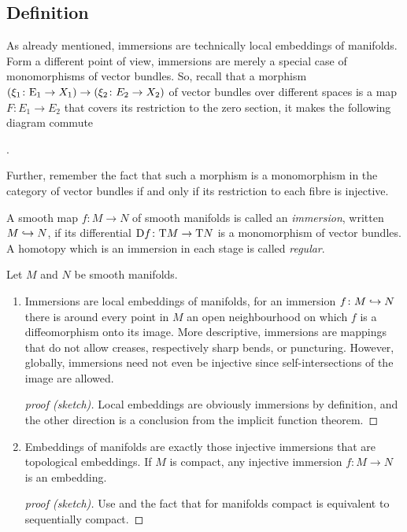 \subsection{Definition}
As already mentioned, immersions are technically local embeddings of
manifolds.
Form a different point of view, immersions are merely a special case
of monomorphisms of vector bundles. So, recall that a morphism
$(\xi_1\colon\mathrm{E}_1\to X_1)\to(\xi_2\colon E_2\to X_2)$ 
of vector bundles over different spaces is a map $F\colon E_1\to E_2$
that covers its restriction to the zero section, \idest it makes the
following diagram commute
\begin{center}
  .
\end{center}
Further, remember the fact that such a morphism is a monomorphism in
the category of vector bundles if and only if its restriction to each
fibre is injective.
\begin{Def}
  A smooth map $f\colon M\to N$ of smooth manifolds is called
  an \emph{immersion}, written $M\hookrightarrow N$, if its differential
  $\mathrm{D} f\colon\mathrm{T}M\to\mathrm{T}N$ is a monomorphism of vector
  bundles.
  A homotopy which is an immersion in each stage is called \emph{regular}.
\end{Def}
\begin{Rem}
  Let $M$ and $N$ be smooth manifolds.
  \begin{enumerate}
  \item
    Immersions are local embeddings of manifolds, \idest for an
    immersion $f\colon M\hookrightarrow N$ there is around every point in $M$
    an open neighbourhood on which $f$ is a diffeomorphism onto its image.
    More descriptive, immersions are mappings that do not allow creases,
    respectively sharp bends, or puncturing.
    However, globally, immersions need not even be injective since
    \forexample self-intersections of the image are allowed.
    \begin{proof}[proof (sketch)]
      Local embeddings are obviously immersions by definition, and the
      other direction is a conclusion from the implicit function theorem.
    \end{proof}
  \item Embeddings of manifolds are exactly those injective immersions
    that are topological embeddings.
    If $M$ is compact, any injective immersion $f\colon M\to N$ is an
    embedding.
    \begin{proof}[proof (sketch)]
      Use \cite[Chap.~II, Lemma~2.6]{adachi} and the fact that for
      manifolds compact is equivalent to sequentially compact.
    \end{proof}
  \end{enumerate}
\end{Rem}

